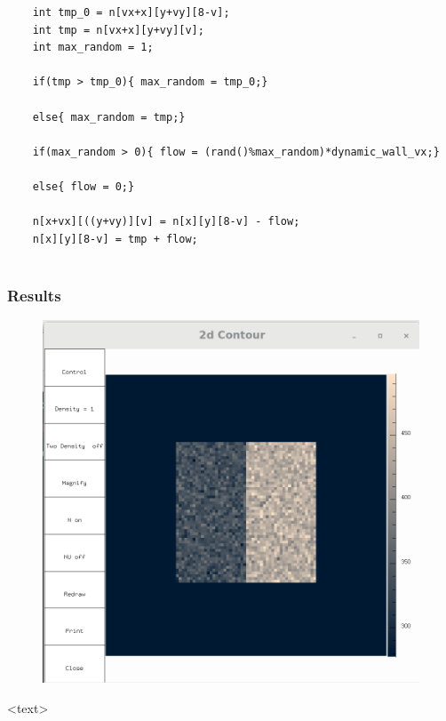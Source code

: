 \documentclass{beamer}
\begin{document}
\begin{frame}[fragile]
\begin{lstlisting}
	int tmp_0 = n[vx+x][y+vy][8-v];
    int tmp = n[vx+x][y+vy][v];
	int max_random = 1;
	
	if(tmp > tmp_0){ max_random = tmp_0;}
	
	else{ max_random = tmp;}
	
	if(max_random > 0){ flow = (rand()%max_random)*dynamic_wall_vx;}
		
	else{ flow = 0;}

    n[x+vx][((y+vy)][v] = n[x][y][8-v] - flow;
    n[x][y][8-v] = tmp + flow;	
	
\end{lstlisting}
\end{frame}

\begin{frame}
\frametitle{Results}
\begin{figure}
\includegraphics[scale=0.2]{A1p1}
\caption{}
\end{figure}
<text>
\end{frame}
\end{document}
